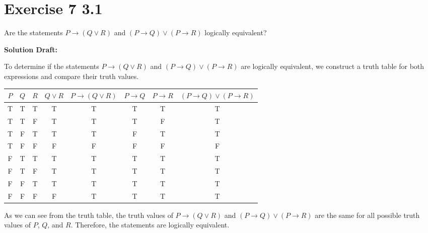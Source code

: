 \documentclass{article}
\begin{document}
\section*{Exercise 7 3.1}  

Are the statements $P \rightarrow (Q\vee R)$ and \((P \rightarrow Q) \lor (P \rightarrow R)\) logically equivalent?

\vspace{0.5cm}
\noindent\textbf{Solution Draft:} 
\vspace{0.2cm}


To determine if the statements \( P \rightarrow (Q \lor R) \) and \( (P \rightarrow Q) \lor (P \rightarrow R) \) are logically equivalent, we construct a truth table for both expressions and compare their truth values.

\begin{tabular}{ccc|c|c|c|c|c}
\(P\) & \(Q\) & \(R\) & \(Q \lor R\) & \(P \rightarrow (Q \lor R)\) & \(P \rightarrow Q\) & \(P \rightarrow R\) & \((P \rightarrow Q) \lor (P \rightarrow R)\) \\
\hline
T & T & T & T & T & T & T & T \\
T & T & F & T & T & T & F & T \\
T & F & T & T & T & F & T & T \\
T & F & F & F & F & F & F & F \\
F & T & T & T & T & T & T & T \\
F & T & F & T & T & T & T & T \\
F & F & T & T & T & T & T & T \\
F & F & F & F & T & T & T & T \\
\end{tabular}

As we can see from the truth table, the truth values of \( P \rightarrow (Q \lor R) \) and \( (P \rightarrow Q) \lor (P \rightarrow R) \) are the same for all possible truth values of \( P \), \( Q \), and \( R \). Therefore, the statements are logically equivalent.




\end{document}
